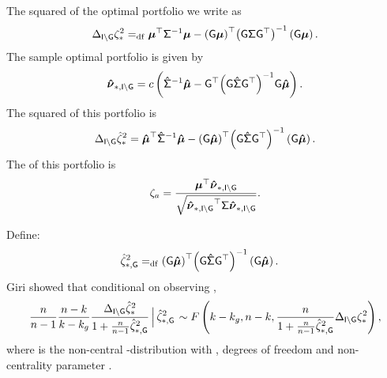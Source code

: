 \documentclass[10pt,a4paper,english]{article}
\theoremstyle{plain}
\theoremstyle{definition}
\theoremstyle{remark}
\begin{document}
The squared \txtSNR of the optimal portfolio we write as 
\begin{equation}
\Hejpsnrsqopt{\hejG} 
\defeq 
\qiform{\pvsig}{\pvmu} - \qiform{\wrapParens{\qoform{\pvsig}{\hejG}}}{\wrapParens{\hejG\pvmu}}.
\label{eqn:psnr_Gcons}
\end{equation}
The sample optimal portfolio is given by 
\begin{equation*}
  \sportwoptHej{\hejG}
= c \wrapParens{\minv{\svsig}{\svmu} -
  \qiform{\wrapParens{\qoform{\svsig}{\hejG}}}{\hejG}\svmu}.
\end{equation*}
The squared \txtSR of this portfolio is
\begin{equation}
\Hejssrsqopt{\hejG}
= \qiform{\svsig}{\svmu} -
  \qiform{\wrapParens{\qoform{\svsig}{\hejG}}}{\wrapParens{\hejG\svmu}}.
\label{eqn:ssr_Gcons} 
\end{equation}
The \txtASNR of this portfolio is
\begin{equation}
  \psnr[a] = 
  \frac{\tr{\pvmu}\sportwoptHej{\hejG}}{\sqrt{\qform{\pvsig}{\sportwoptHej{\hejG}}}}.
\end{equation}

Define:
\begin{align*}
\ssrsqoptG{\hejG} &\defeq \qiform{\wrapParens{\qoform{\svsig}{\hejG}}}{\wrapParens{\hejG\svmu}}.
\end{align*}
Giri showed that conditional on observing \ssrsqoptG{\hejG},
{\small
\begin{equation}
\acondb{
	\frac{\ssiz}{\ssiz-1}\frac{\ssiz - \nstrat}{\nstrat - \nstrathej}\frac{\Hejssrsqopt{\hejG}}{1 +
  \frac{\ssiz}{\ssiz-1}\ssrsqoptG{\hejG}} 
}{\ssrsqoptG{\hejG}}
	\sim
\ncflaw{\nstrat-\nstrathej,\ssiz-\nstrat,\frac{\ssiz}{1 +
\frac{\ssiz}{\ssiz-1}\ssrsqoptG{\hejG}} 
	\Hejpsnrsqopt{\hejG}
	},
\label{eqn:giri_done_I}
\end{equation}%
}%
where \ncflaw{\df[1],\df[2],\ncfp} is the non-central \flaw{}-distribution
with \df[1], \df[2] degrees of freedom and non-centrality parameter
\ncfp.  \cite{giri1964likelihood,pav_the_book}
\end{document}
